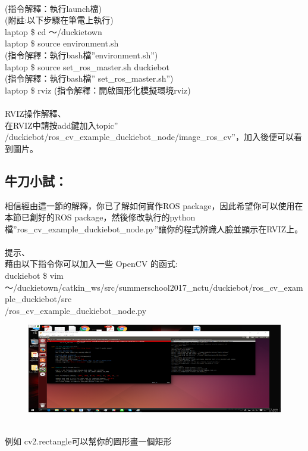 \documentclass{article}
\begin{document}
\\(指令解釋：執行launch檔)
\\(附註:以下步驟在筆電上執行)
\\laptop \$ cd ～/duckietown
\\laptop \$ source environment.sh
\\(指令解釋：執行bash檔”environment.sh”)
\\laptop \$ source set\_ros\_master.sh duckiebot
\\(指令解釋：執行bash檔” set\_ros\_master.sh”)
\\laptop \$ rviz 
(指令解釋：開啟圖形化模擬環境rviz)
\\\\RVIZ操作解釋、
\\在RVIZ中請按add鍵加入topic” /duckiebot/ros\_cv\_example\_duckiebot\_node/image\_ros\_cv”，加入後便可以看到圖片。
\subsection{牛刀小試：}
相信經由這一節的解釋，你已了解如何實作ROS package，因此希望你可以使用在本節已創好的ROS package，然後修改執行的python檔”ros\_cv\_example\_duckiebot\_node.py”讓你的程式辨識人臉並顯示在RVIZ上。
\\\\提示、
\\藉由以下指令你可以加入一些 OpenCV 的函式:
\\duckiebot \$ vim ～/duckietown/catkin\_ws/src/summerschool2017\_nctu/duckiebot/ros\_cv\_example\_duckiebot/src\\/ros\_cv\_example\_duckiebot\_node.py
\begin{figure}[htp]
    \begin{center}
        \includegraphics[width=400pt]{pic/5_2_10.png}
    \end{center}
\end{figure}
\\
例如 cv2.rectangle可以幫你的圖形畫一個矩形

\newpage
\end{document}

